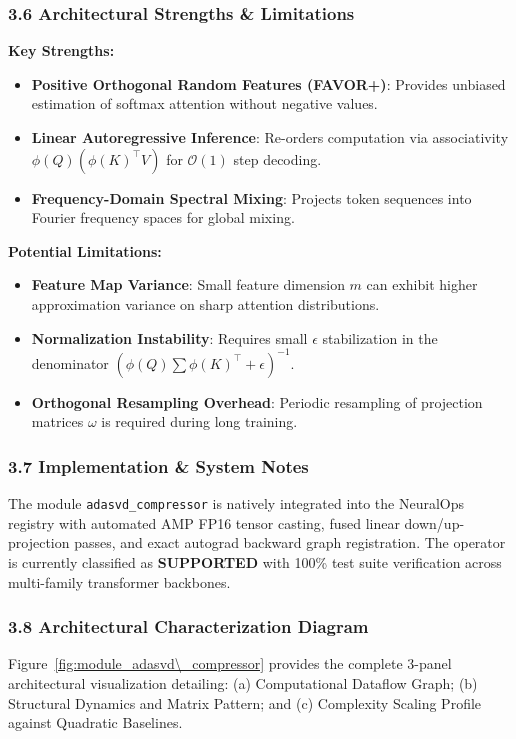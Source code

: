 \subsubsection*{3.6 Architectural Strengths \& Limitations}
\textbf{Key Strengths:}
\begin{itemize}
    \item \textbf{Positive Orthogonal Random Features (FAVOR+)}: Provides unbiased estimation of softmax attention without negative values.
    \item \textbf{Linear Autoregressive Inference}: Re-orders computation via associativity $\phi(Q) (\phi(K)^\top V)$ for $\mathcal{O}(1)$ step decoding.
    \item \textbf{Frequency-Domain Spectral Mixing}: Projects token sequences into Fourier frequency spaces for global mixing.
\end{itemize}

\textbf{Potential Limitations:}
\begin{itemize}
    \item \textbf{Feature Map Variance}: Small feature dimension $m$ can exhibit higher approximation variance on sharp attention distributions.
    \item \textbf{Normalization Instability}: Requires small $\epsilon$ stabilization in the denominator $(\phi(Q) \sum \phi(K)^\top + \epsilon)^{-1}$.
    \item \textbf{Orthogonal Resampling Overhead}: Periodic resampling of projection matrices $\omega$ is required during long training.
\end{itemize}

\subsubsection*{3.7 Implementation \& System Notes}
The module \texttt{adasvd\_compressor} is natively integrated into the NeuralOps registry with automated AMP FP16 tensor casting, fused linear down/up-projection passes, and exact autograd backward graph registration. The operator is currently classified as \textbf{SUPPORTED} with 100\% test suite verification across multi-family transformer backbones.

\subsubsection*{3.8 Architectural Characterization Diagram}
Figure~\ref{fig:module_adasvd\_compressor} provides the complete 3-panel architectural visualization detailing: (a) Computational Dataflow Graph; (b) Structural Dynamics and Matrix Pattern; and (c) Complexity Scaling Profile against Quadratic Baselines.

